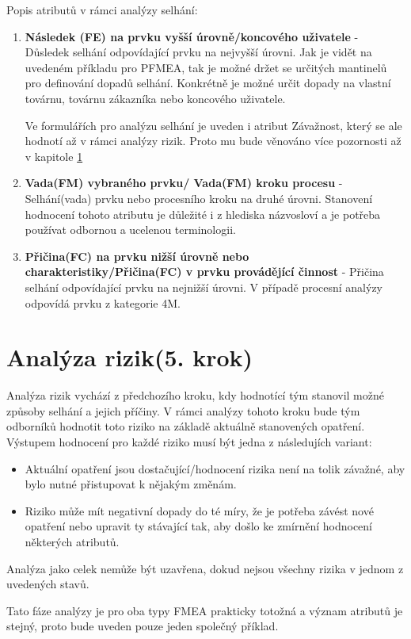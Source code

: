 \clearpage
Popis atributů v rámci analýzy selhání:
\begin{enumerate}
	\item \textbf{Následek (FE) na prvku vyšší úrovně/koncového uživatele } - Důsledek selhání odpovídající prvku na nejvyšší úrovni. Jak je vidět na uvedeném příkladu pro PFMEA, tak je možné držet se určitých mantinelů pro definování dopadů selhání. Konkrétně je možné určit dopady na vlastní továrnu, továrnu zákazníka nebo koncového uživatele. 
 
 Ve formulářích pro analýzu selhání je uveden i atribut Závažnost, který se ale hodnotí až v rámci analýzy rizik. Proto mu bude věnováno více pozornosti až v kapitole \ref{sec:FMEA_postup_5}
	\item \textbf{Vada(FM) vybraného prvku/ Vada(FM) kroku procesu} - Selhání(vada) prvku nebo procesního kroku na druhé úrovni. Stanovení hodnocení tohoto atributu je důležité i z hlediska názvosloví a je potřeba používat odbornou a ucelenou terminologii.  
	\item \textbf{Přičina(FC) na prvku nižší úrovně nebo charakteristiky/Přičina(FC) v prvku provádějící činnost} - Přičina selhání odpovídající prvku na nejnižší úrovni. V případě procesní analýzy odpovídá prvku z kategorie 4M. 
\end{enumerate}




\section{Analýza rizik(5. krok)}
\label{sec:FMEA_postup_5}
Analýza rizik vychází z předchozího kroku, kdy hodnotící tým stanovil možné způsoby selhání a jejich příčiny. V rámci analýzy tohoto kroku bude tým odborníků hodnotit toto riziko na základě aktuálně stanovených opatření. Výstupem hodnocení pro každé riziko musí být jedna z následujích variant:
\begin{itemize}
	\item Aktuální opatření jsou dostačující/hodnocení rizika není na tolik závažné, aby bylo nutné přistupovat k nějakým změnám. 
    \item Riziko může mít negativní dopady do té míry, že je potřeba závést nové opatření nebo upravit ty stávající tak, aby došlo ke zmírnění hodnocení některých atributů.
\end{itemize}
Analýza jako celek nemůže být uzavřena, dokud nejsou všechny rizika v jednom z uvedených stavů.

Tato fáze analýzy je pro oba typy FMEA prakticky totožná a význam atributů je stejný, proto bude uveden pouze jeden společný příklad.

